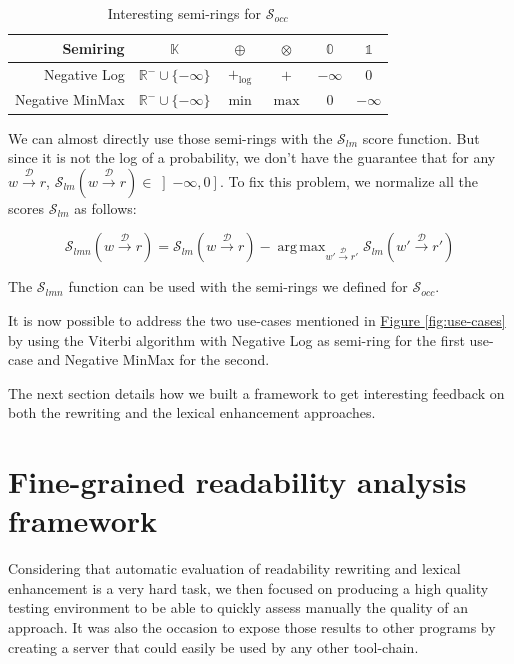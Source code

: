 \documentclass[a4paper, 11pt, onepage]{scrreprt}
\newcommand\figureref[1]{\hyperref[#1]{Figure \ref*{#1}}}
\newcommand\maps[1]{\xrightarrow{\mathcal{#1}}}
\DeclareMathOperator*{\argmax}{\arg\,\max}
\begin{document}
\begin{table}[H]
  \centering
  \begin{tabular}{rccccc}
    \toprule
    Semiring & $\mathbb{K}$ & $\oplus$ & $\otimes$ & $\mathbb{0}$ & $\mathbb{1}$
    \\
    \midrule
    Negative Log & $\mathbb{R}^{-} \cup \{-\infty\}$ & $+_{\log}$ & $+$ & $-\infty$ & $0$ \\
    Negative MinMax & $\mathbb{R}^{-} \cup \{-\infty\}$ & $\min$ & $\max$ & 0 & $-\infty$ \\
  \end{tabular}
  \caption{Interesting semi-rings for $\mathcal{S}_{occ}$}
  \label{tab:semi-rings}
\end{table}

We can almost directly use those semi-rings with the
$\mathcal{S}_{lm}$ score function. But since it is not the log of a
probability, we don't have the guarantee that for any $w \maps{D} r$,
$\mathcal{S}_{lm}\left( w \maps{D} r \right) \in \left]-\infty,
  0\right]$. To fix this problem, we normalize all the scores
$\mathcal{S}_{lm}$ as follows:

\[
\mathcal{S}_{lmn} \left( w \maps{D} r \right)
= \mathcal{S}_{lm} \left( w \maps{D} r \right)
- \argmax_{w' \maps{D} r'} \mathcal{S}_{lm} \left(w' \maps{D} r' \right)
\]

The $\mathcal{S}_{lmn}$ function can be used with the semi-rings we
defined for $\mathcal{S}_{occ}$.

It is now possible to address the two use-cases mentioned in
\figureref{fig:use-cases} by using the Viterbi algorithm
\cite{forney1973viterbi} with Negative Log as semi-ring for the first
use-case and Negative MinMax for the second.

The next section details how we built a framework to get interesting
feedback on both the rewriting and the lexical enhancement
approaches.

\section{Fine-grained readability analysis framework}
\label{sec:framework}

Considering that automatic evaluation of readability rewriting and
lexical enhancement is a very hard task, we then focused on producing
a high quality testing environment to be able to quickly assess
manually the quality of an approach. It was also the occasion to
expose those results to other programs by creating a server that could
easily be used by any other tool-chain.
\end{document}
